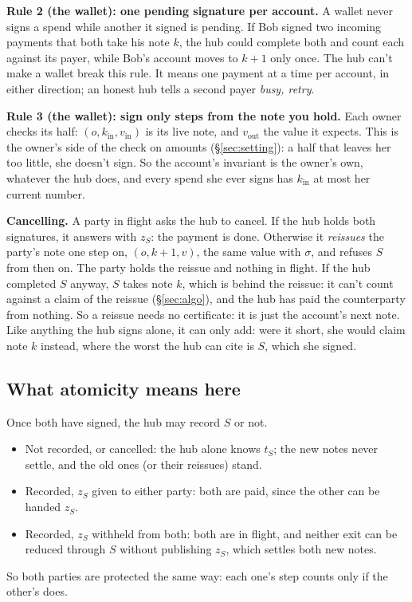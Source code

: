 \documentclass[11pt]{article}
\theoremstyle{plain}
\theoremstyle{definition}
\newcommand{\kin}{k_{\mathrm{in}}}
\newcommand{\vin}{v_{\mathrm{in}}}
\newcommand{\vout}{v_{\mathrm{out}}}
\begin{document}
\textbf{Rule 2 (the wallet): one pending signature per account.} A
wallet never signs a spend while another it signed is pending. If Bob
signed two incoming payments that both take his note $k$, the hub could
complete both and count each against its payer, while Bob's account
moves to $k+1$ only once. The hub can't make a wallet break this rule.
It means one payment at a time per account, in either direction; an
honest hub tells a second payer \emph{busy, retry}.

\textbf{Rule 3 (the wallet): sign only steps from the note you hold.}
Each owner checks its half: $(o, \kin, \vin)$ is its live note, and
$\vout$ the value it expects. This is the owner's side of the check on
amounts (\S\ref{sec:setting}): a half that leaves her too little, she
doesn't sign. So the account's invariant is the owner's own, whatever
the hub does, and every spend she ever signs has $\kin$ at most her
current number.

\textbf{Cancelling.} A party in flight asks the hub to cancel. If the
hub holds both signatures, it answers with $z_S$: the payment is done.
Otherwise it \emph{reissues} the party's note one step on, $(o, k + 1,
v)$, the same value with $\sigma$, and refuses $S$ from then on. The
party holds the reissue and nothing in flight. If the hub completed $S$
anyway, $S$ takes note $k$, which is behind the reissue: it can't count
against a claim of the reissue (\S\ref{sec:algo}), and the hub has paid
the counterparty from nothing. So a reissue needs no certificate: it is
just the account's next note. Like anything the hub signs alone, it can
only add: were it short, she would claim note $k$ instead, where the
worst the hub can cite is $S$, which she signed.

\subsection{What atomicity means here}\label{sec:atomic}

Once both have signed, the hub may record $S$ or not.
\begin{itemize}[nosep]
\item Not recorded, or cancelled: the hub alone knows $t_S$; the new
  notes never settle, and the old ones (or their reissues) stand.
\item Recorded, $z_S$ given to either party: both are paid, since the
  other can be handed $z_S$.
\item Recorded, $z_S$ withheld from both: both are in flight, and
  neither exit can be reduced through $S$ without publishing $z_S$,
  which settles both new notes.
\end{itemize}
So both parties are protected the same way: each one's step counts only
if the other's does.
\end{document}
